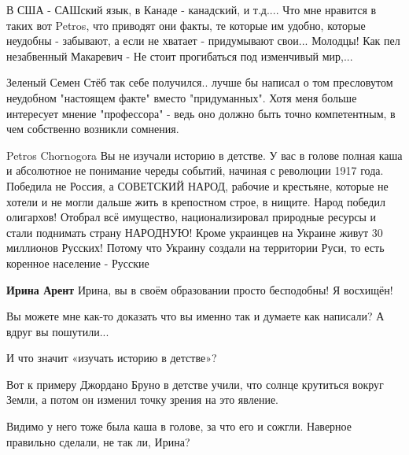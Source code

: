 \begin{itemize}
\begin{itemize}


В США - САШский язык, в Канаде - канадский, и т.д.... Что мне нравится в таких
вот Petros, что приводят они факты, те которые им удобно, которые неудобны -
забывают, а если не хватает - придумывают свои... Молодцы! Как пел незабвенный
Макаревич - Не стоит прогибаться под изменчивый мир,...





Зеленый Семен Стёб так себе получился.. лучше бы написал о том пресловутом
неудобном "настоящем факте" вместо "придуманных".  Хотя меня больше интересует
мнение "профессора" - ведь оно должно быть точно компетентным, в чем собственно
возникли сомнения.


Petros Chornogora Вы не изучали историю в детстве. У вас в голове полная каша и
абсолютное не понимание череды событий, начиная с революции 1917 года. Победила
не Россия, а СОВЕТСКИЙ НАРОД, рабочие и крестьяне, которые не хотели и не могли
дальше жить в крепостном строе, в нищите. Народ победил олигархов! Отобрал всё
имущество, национализировал природные ресурсы и стали поднимать страну
НАРОДНУЮ! Кроме украинцев на Украине живут 30 миллионов Русских! Потому что
Украину создали на территории Руси, то есть коренное население - Русские



\textbf{Ирина Арент} Ирина, вы в своём образовании просто бесподобны! Я восхищён!

Вы можете мне как-то доказать что вы именно так и думаете как написали? А вдруг
вы пошутили...

И что значит «изучать историю в детстве»?

Вот к примеру Джордано Бруно в детстве учили, что солнце крутиться вокруг
Земли, а потом он изменил точку зрения на это явление.

Видимо у него тоже была каша в голове, за что его и сожгли. Наверное правильно
сделали, не так ли, Ирина?

\end{itemize}




\end{itemize}
